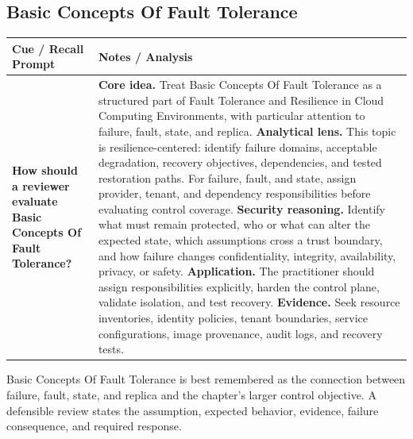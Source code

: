 \documentclass[11pt]{article}
\newcommand{\CornellHeader}{%
\rowcolor{Navy}\color{white}\bfseries Cue / Recall Prompt & \color{white}\bfseries Notes / Analysis\\\hline}
\newcommand{\CornellRow}[2]{%
\cellcolor{CueGray}\RaggedRight\textbf{#1} & \RaggedRight #2\\\hline}
\begin{document}
\subsection*{Basic Concepts Of Fault Tolerance}
\begin{longtable}{>{\RaggedRight\arraybackslash}p{}|>{\RaggedRight\arraybackslash}p{}}
\CornellHeader
\CornellRow{How should a reviewer evaluate Basic Concepts Of Fault Tolerance?}{\textbf{Core idea.} Treat Basic Concepts Of Fault Tolerance as a structured part of Fault Tolerance and Resilience in Cloud Computing Environments, with particular attention to failure, fault, state, and replica. \textbf{Analytical lens.} This topic is resilience-centered: identify failure domains, acceptable degradation, recovery objectives, dependencies, and tested restoration paths. For failure, fault, and state, assign provider, tenant, and dependency responsibilities before evaluating control coverage. \textbf{Security reasoning.} Identify what must remain protected, who or what can alter the expected state, which assumptions cross a trust boundary, and how failure changes confidentiality, integrity, availability, privacy, or safety. \textbf{Application.} The practitioner should assign responsibilities explicitly, harden the control plane, validate isolation, and test recovery. \textbf{Evidence.} Seek resource inventories, identity policies, tenant boundaries, service configurations, image provenance, audit logs, and recovery tests.}
\end{longtable}
\begin{topicsummary}
Basic Concepts Of Fault Tolerance is best remembered as the connection between failure, fault, state, and replica and the chapter's larger control objective. A defensible review states the assumption, expected behavior, evidence, failure consequence, and required response.
\end{topicsummary}
\end{document}

